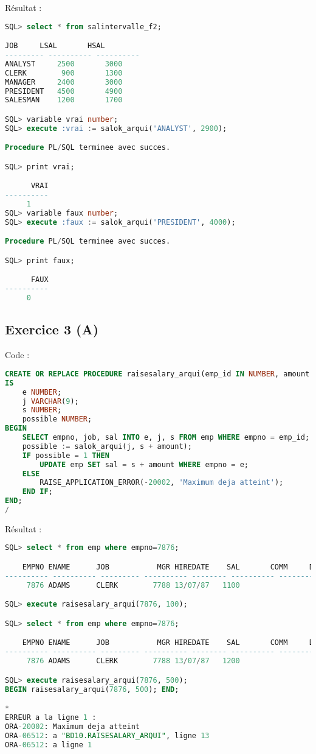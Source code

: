 \documentclass{article}
\begin{document}
Résultat :
\begin{lstlisting}[language=SQL,
    morekeywords={DECLARE, LOOP, TYPE, FOR, IF, IS, OPEN, FETCH, DBMS_OUTPUT, PUT_LINE}]
SQL> select * from salintervalle_f2;

JOB		LSAL	   HSAL
--------- ---------- ----------
ANALYST 	2500	   3000
CLERK		 900	   1300
MANAGER 	2400	   3000
PRESIDENT	4500	   4900
SALESMAN	1200	   1700

SQL> variable vrai number;
SQL> execute :vrai := salok_arqui('ANALYST', 2900);

Procedure PL/SQL terminee avec succes.

SQL> print vrai;

      VRAI
----------
	 1
SQL> variable faux number;
SQL> execute :faux := salok_arqui('PRESIDENT', 4000);

Procedure PL/SQL terminee avec succes.

SQL> print faux;

      FAUX
----------
	 0
\end{lstlisting}

\subsection{Exercice 3 (A)}
Code :
\begin{lstlisting}[language=SQL,
    deletekeywords={char},
    morekeywords={DECLARE, LOOP, TYPE, FOR, IF, IS, OPEN, FETCH, DBMS_OUTPUT, PUT_LINE}]
CREATE OR REPLACE PROCEDURE raisesalary_arqui(emp_id IN NUMBER, amount IN NUMBER)
IS
    e NUMBER;
    j VARCHAR(9);
    s NUMBER;
    possible NUMBER;
BEGIN
    SELECT empno, job, sal INTO e, j, s FROM emp WHERE empno = emp_id;
    possible := salok_arqui(j, s + amount);
    IF possible = 1 THEN 
        UPDATE emp SET sal = s + amount WHERE empno = e;
    ELSE
        RAISE_APPLICATION_ERROR(-20002, 'Maximum deja atteint');
    END IF;
END;
/
\end{lstlisting}

Résultat :
\begin{lstlisting}[language=SQL,
    morekeywords={DECLARE, LOOP, TYPE, FOR, IF, IS, OPEN, FETCH, DBMS_OUTPUT, PUT_LINE}]
SQL> select * from emp where empno=7876;

    EMPNO ENAME      JOB	       MGR HIREDATE	   SAL	     COMM     DEPTNO
---------- ---------- --------- ---------- -------- ---------- ---------- ----------
     7876 ADAMS      CLERK	      7788 13/07/87	  1100			           20

SQL> execute raisesalary_arqui(7876, 100);

SQL> select * from emp where empno=7876;

    EMPNO ENAME      JOB	       MGR HIREDATE	   SAL	     COMM     DEPTNO
---------- ---------- --------- ---------- -------- ---------- ---------- ----------
     7876 ADAMS      CLERK	      7788 13/07/87	  1200			            20

SQL> execute raisesalary_arqui(7876, 500);
BEGIN raisesalary_arqui(7876, 500); END;

*
ERREUR a la ligne 1 :
ORA-20002: Maximum deja atteint
ORA-06512: a "BD10.RAISESALARY_ARQUI", ligne 13
ORA-06512: a ligne 1
\end{lstlisting}
\end{document}
